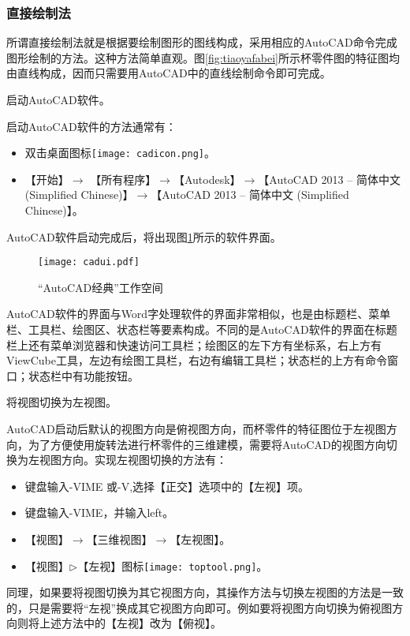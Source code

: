 \subsubsection{直接绘制法}\label{sec:beilingjianleft}
所谓直接绘制法就是根据要绘制图形的图线构成，采用相应的AutoCAD命令完成图形绘制的方法。这种方法简单直观。图\ref{fig:tiaoyafabei}所示杯零件图的特征图均由直线构成，因而只需要用AutoCAD中的直线绘制命令即可完成。
\begin{procedure}

\item 启动AutoCAD软件。

启动AutoCAD软件的方法通常有：
\begin{itemize}
\item 双击桌面图标\texttt{[image: cadicon.png]}。
\item 【开始】$\rightarrow$ 【所有程序】$\rightarrow$【Autodesk】$\rightarrow$【AutoCAD 2013 – 简体中文 (Simplified Chinese)】$\rightarrow$【AutoCAD 2013 – 简体中文 (Simplified Chinese)】。
\end{itemize}
AutoCAD软件启动完成后，将出现图\ref{fig:cadui}所示的软件界面。
\begin{figure}[htbp]
\centering
\texttt{[image: cadui.pdf]}
\caption{“AutoCAD经典”工作空间}\label{fig:cadui}
\end{figure}
AutoCAD软件的界面与Word字处理软件的界面非常相似，也是由标题栏、菜单栏、工具栏、绘图区、状态栏等要素构成。不同的是AutoCAD软件的界面在标题栏上还有菜单浏览器和快速访问工具栏；绘图区的左下方有坐标系，右上方有ViewCube工具，左边有绘图工具栏，右边有编辑工具栏；状态栏的上方有命令窗口；状态栏中有功能按钮。

\item 将视图切换为左视图。

AutoCAD启动后默认的视图方向是俯视图方向，而杯零件的特征图位于左视图方向，为了方便使用旋转法进行杯零件的三维建模，需要将AutoCAD的视图方向切换为左视图方向。实现左视图切换的方法有：
\begin{itemize}
\item 键盘输入-VIME 或-V,选择【正交】选项中的【左视】项。
\item 键盘输入-VIME，并输入left。
\item 【视图】$\rightarrow$【三维视图】$\rightarrow$【左视图】。
\item 【视图】$\triangleright$【左视】图标\texttt{[image: toptool.png]}。
\end{itemize}
同理，如果要将视图切换为其它视图方向，其操作方法与切换左视图的方法是一致的，只是需要将“左视”换成其它视图方向即可。例如要将视图方向切换为俯视图方向则将上述方法中的【左视】改为【俯视】。


\end{procedure}
